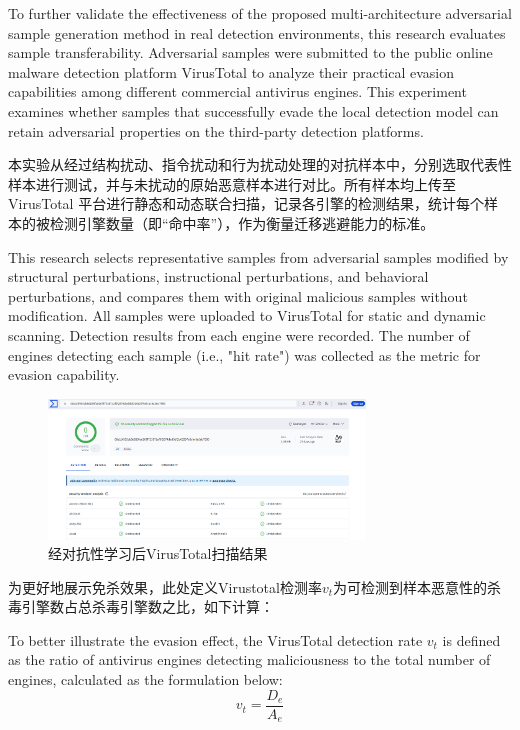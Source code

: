 To further validate the effectiveness of the proposed multi-architecture adversarial sample generation method in real detection environments, this research evaluates sample transferability. Adversarial samples were submitted to the public online malware detection platform VirusTotal to analyze their practical evasion capabilities among different commercial antivirus engines. This experiment examines whether samples that successfully evade the local detection model can retain adversarial properties on the third-party detection platforms.

本实验从经过结构扰动、指令扰动和行为扰动处理的对抗样本中，分别选取代表性样本进行测试，并与未扰动的原始恶意样本进行对比。所有样本均上传至 VirusTotal 平台进行静态和动态联合扫描，记录各引擎的检测结果，统计每个样本的被检测引擎数量（即“命中率”），作为衡量迁移逃避能力的标准。

This research selects representative samples from adversarial samples modified by structural perturbations, instructional perturbations, and behavioral perturbations, and compares them with original malicious samples without modification. All samples were uploaded to VirusTotal for static and dynamic scanning. Detection results from each engine were recorded. The number of engines detecting each sample (i.e., "hit rate") was collected as the metric for evasion capability.

\begin{figure}[htbp]
	\centering
	\includegraphics[width=0.75\textwidth]{figures/5.3}
	\caption{经对抗性学习后VirusTotal扫描结果}\label{fig:5.3}
\end{figure}


为更好地展示免杀效果，此处定义Virustotal检测率$v_t$为可检测到样本恶意性的杀毒引擎数占总杀毒引擎数之比，如下计算： 

To better illustrate the evasion effect, the VirusTotal detection rate $v_t$ is defined as the ratio of antivirus engines detecting maliciousness to the total number of engines, calculated as the formulation below:
\begin{equation}
v_t = \frac{D_e}{A_e}
\tag{5.9}
\end{equation}


